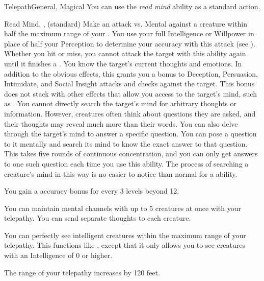 \begin{magicalfeat}{Telepath}{General, Magical}
         You can use the \textit{read mind} ability as a standard action.
        \begin{magicalsustainability}{Read Mind}{, ,  (standard)}
            \rankline
            Make an attack vs. Mental against a creature within half the maximum range of your .
            You use your full Intelligence or Willpower in place of half your Perception to determine your accuracy with this attack (see ).
            Whether you hit or miss, you cannot attack the target with this ability again until it finishes a .
            \hit You know the target's current thoughts and emotions.
            In addition to the obvious effects, this grants you a  bonus to Deception, Persuasion, Intimidate, and Social Insight attacks and checks against the target.
            This bonus does not stack with other effects that allow you access to the target's mind, such as .
            You cannot directly search the target's mind for arbitrary thoughts or information.
            However, creatures often think about questions they are asked, and their thoughts may reveal much more than their words.
            \crit You can also delve through the target's mind to answer a specific question.
            You can pose a question to it mentally and search its mind to know the exact answer to that question.
            This takes five rounds of continuous concentration, and you can only get answers to one such question each time you use this ability.
            The process of searching a creature's mind in this way is no easier to notice than normal for a  ability.

            \rankline
            You gain a  accuracy bonus for every 3 levels beyond 12.
        \end{magicalsustainability}

         You can maintain mental channels with up to 5 creatures at once with your telepathy.
        You can send separate thoughts to each creature.

         You can perfectly see intelligent creatures within the maximum range of your telepathy.
        This functions like , except that it only allows you to see creatures with an Intelligence of 0 or higher.

         The range of your telepathy increases by 120 feet.
    \end{magicalfeat}

